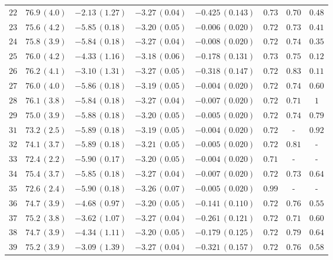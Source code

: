 \begin{table}
{\begin{tabular}{cccccccc}
$22$ & $76.9\,(4.0)$&$-2.13\,(1.27)$ &$-3.27\,(0.04) $ &$-0.425\,(0.143) $ & $ 0.73 $ & $ 0.70 $ & $ 0.48 $\\
 
$23$ &$75.6\,(4.2)$ &$-5.85\,(0.18)$ &$-3.20\,(0.05) $ &$-0.006\,(0.020) $ & $ 0.72 $ & $ 0.73 $ & $ 0.41 $\\

$24$ &$75.8\,(3.9)$ &$-5.84\,(0.18)$ &$-3.27\,(0.04) $ &$-0.008\,(0.020) $ & $ 0.72 $ & $ 0.74 $ & $ 0.35 $\\


$25$ & $76.0\,(4.2)$ &$-4.33\,(1.16)$ &$-3.18\,(0.06) $ &$-0.178\,(0.131) $ & $0.73 $ & $0.75 $ & $ 0.12$\\

$26$ & $76.2\,(4.1)$ &$-3.10\,(1.31)$ &$-3.27\,(0.05) $ &$-0.318\,(0.147) $ & $ 0.72$ & $0.83 $ & $ 0.11$\\
 
$27$ &$76.0\,(4.0)$ &$-5.86\,(0.18)$ &$-3.19\,(0.05) $ &$-0.004\,(0.020) $ & $0.72 $ & $0.74 $ & $ 0.60$\\

$28$ &$76.1\,(3.8)$ &$-5.84\,(0.18)$ &$-3.27\,(0.04) $ &$-0.007\,(0.020) $ & $0.72 $ & $ 0.71$ & $1 $\\


$29$ & $75.0\,(3.9)$ & $-5.88\,(0.18)$ & $-3.20\,(0.05)$ & $-0.005\,(0.020) $ & $ 0.72 $ & $ 0.74 $ & $ 0.79$\\
$31$ & $73.2\,(2.5)$ & $-5.89\,(0.18)$ & $-3.19\,(0.05)$ & $-0.004\,(0.020) $ & $ 0.72$ & - & $ 0.92$\\
$32$ & $74.1\,(3.7)$ & $-5.89\,(0.18)$ & $-3.21\,(0.05)$ & $-0.005\,(0.020) $ & $ 0.72 $ & $ 0.81$ & -\\
$33$ & $72.4\,(2.2)$ & $-5.90\,(0.17)$ & $-3.20\,(0.05)$ & $-0.004\,(0.020) $ & $ 0.71$ & - & -\\
$34$ & $75.4\,(3.7)$ & $-5.85\,(0.18)$ & $-3.27\,(0.04)$ & $-0.007\,(0.020) $ & $ 0.72 $ & $ 0.73$ & $0.64 $\\
$35$ & $72.6\,(2.4)$ & $-5.90\,(0.18)$ & $-3.26\,(0.07)$ & $-0.005\,(0.020) $ & $ 0.99$ & - & - \\
$36$ & $74.7\,(3.9)$ & $-4.68\,(0.97)$ & $-3.20\,(0.05) $ & $-0.141\,(0.110) $ & $0.72 $ & $ 0.76$ & $0.55 $ \\
$37$ & $ 75.2\,(3.8)$ & $-3.62\,(1.07)$ & $-3.27\,(0.04)$ & $-0.261\,(0.121) $ & $0.72 $ & $ 0.71$ & $0.60 $\\
$38$ & $74.7\,(3.9)$ & $-4.34\,(1.11)$ & $-3.20\,(0.05)$ & $-0.179\,(0.125) $ & $0.72 $ & $0.79 $ & $ 0.64$\\
$39$ & $75.2\,(3.9)$ & $-3.09\,(1.39)$ & $-3.27\,(0.04)$ & $-0.321\,(0.157) $ & $ 0.72 $ & $0.76 $ & $0.58 $\\


\end{tabular}}
\end{table}

